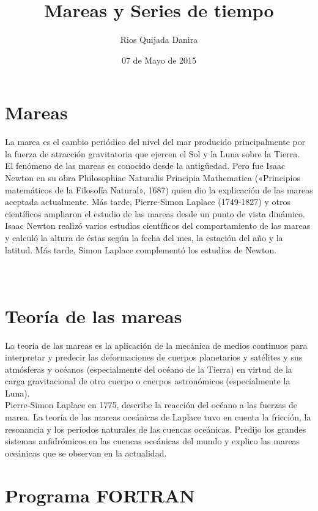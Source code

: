 \documentclass[10pt]{article}
\title{Mareas y Series de tiempo}
\author{Rios Quijada Danira}
\date{07 de Mayo de 2015}
\begin{document}
\maketitle
\section{Mareas}
La marea es el cambio periódico del nivel del mar producido principalmente por la fuerza de atracción gravitatoria que ejercen el Sol y la Luna sobre la Tierra.
\\ \space
El fenómeno de las mareas es conocido desde la antigüedad. Pero fue Isaac Newton en su obra Philosophiae Naturalis Principia Mathematica («Principios matemáticos de la Filosofía Natural», 1687) quien dio la explicación de las mareas aceptada actualmente. Más tarde, Pierre-Simon Laplace (1749-1827) y otros científicos ampliaron el estudio de las mareas desde un punto de vista dinámico.
\\ \space
Isaac Newton realizó varios estudios científicos del comportamiento de las mareas y calculó la altura de éstas según la fecha del mes, la estación del año y la latitud. Más tarde, Simon Laplace complementó los estudios de Newton.
\\
\\
\\
\section{Teoría de las mareas}
La teoría de las mareas es la aplicación de la mecánica de medios continuos para interpretar y predecir las deformaciones de cuerpos planetarios y satélites y sus atmósferas y océanos (especialmente del océano de la Tierra) en virtud de la carga gravitacional de otro cuerpo o cuerpos astronómicos (especialmente la Luna). \\ \space
Pierre-Simon Laplace en 1775, describe la reacción del océano a las fuerzas de marea. La teoría de las mareas oceánicas de Laplace tuvo en cuenta la fricción, la resonancia y los períodos naturales de las cuencas oceánicas. Predijo los grandes sistemas anfidrómicos en las cuencas oceánicas del mundo y explico las mareas oceánicas que se observan en la actualidad.  


\newpage
\section{Programa FORTRAN}
\end{document}
